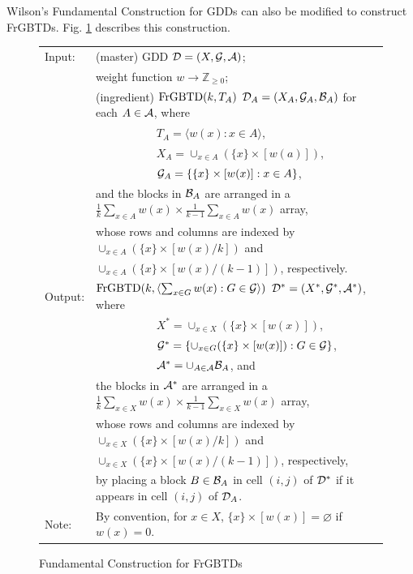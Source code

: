 \documentclass[draft, 11pt]{article}
\begin{document}
Wilson's Fundamental Construction for GDDs \cite{Wilson:1972a} can also be modified to
construct FrGBTDs. Fig. \ref{WFC} describes this construction.

\begin{figure}[!t]
\renewcommand{\arraystretch}{1.1}
\setlength{\tabcolsep}{1pt} 

\centering
\small
\begin{tabular}{| l l|}
\hline
Input: & (master) GDD $\mathcal D=(X,\mathcal G,\mathcal A)$; \\
           & weight function $w\rightarrow\mathbb{Z}_{\geq 0}$; \\
           & (ingredient) ${\rm FrGBTD}(k,T_A)$ $\mathcal D_A=(X_A,\mathcal G_A,\mathcal B_A)$ for each $A\in\mathcal A$, where \\
           & ~~~~~~~~~~ $T_A=\langle w(x): x\in A\rangle$, \\
           & ~~~~~~~~~~ $X_A=\cup_{x\in A} (\{x\}\times[w(a)])$,  \\
           & ~~~~~~~~~~ $\mathcal G_A=\{ \{x\}\times[w(x)] : x\in A\}$, \\
           & and the blocks in $\mathcal B_A$ are arranged in a
           $\frac{1}{k}\sum_{x\in A}w(x) \times \frac{1}{k-1}\sum_{x\in A}w(x)$ array,\\
           & whose rows and columns are indexed by
           $\cup_{x\in A}(\{x\}\times[w(x)/k])$ and \\
           & $\cup_{x\in A}(\{x\}\times[w(x)/(k-1)])$, respectively. \\
Output: & ${\rm FrGBTD}(k,\langle \sum_{x\in G} w(x) :
G\in\mathcal G\rangle)$
$\mathcal D^*=(X^*,\mathcal G^*,\mathcal A^*)$, where \\
              & ~~~~~~~~~~ $X^*=\cup_{x\in X}(\{x\}\times [w(x)])$, \\
              & ~~~~~~~~~~ $\mathcal G^*=\{\cup_{x\in G}(\{x\}\times [w(x)]) : G\in\mathcal G\}$,  \\
              & ~~~~~~~~~~ $\mathcal A^*=\cup_{A\in\mathcal A}\mathcal B_A$, and \\
              & the blocks in $\mathcal A^*$ are arranged in a
              $\frac{1}{k}\sum_{x\in X} w(x) \times \frac{1}{k-1}\sum_{x\in X} w(x)$ array,\\ 
              & whose rows and columns are indexed by
              $\cup_{x\in X}(\{x\}\times [w(x)/k])$ and \\
              & $\cup_{x\in X}(\{x\}\times [w(x)/(k-1)])$, respectively, \\
              &by placing a block $B\in\mathcal B_A$ in cell $(i,j)$ of $\mathcal D^*$ if it appears in
              cell $(i,j)$ of $\mathcal D_A$. \\
Note: & By convention, for $x\in X$, $\{x\}\times[w(x)]=\varnothing$ if $w(x)=0$.\\
\hline
\end{tabular}
\caption{Fundamental Construction for FrGBTDs}
\label{WFC}
\end{figure}
 
\end{document}
